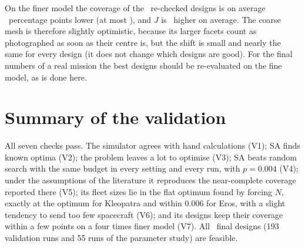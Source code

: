 On the finer model the coverage of the \fineDesigns\ re-checked designs is on average \fineMeanDC\
percentage points lower (at most \fineMaxDC), and $J$ is \fineMeanDJ\ higher on average. The coarse mesh is
therefore slightly optimistic, because its larger facets count as photographed as soon as their
centre is, but the shift is small and nearly the same for every design (it does not change which
designs are good). For the final numbers of a real mission the best designs should be re-evaluated
on the fine model, as is done here.

\section{Summary of the validation}
All seven checks pass. The simulator agrees with hand calculations (V1); \ac{SA} finds known optima
(V2); the problem leaves a lot to optimise (V3); \ac{SA} beats random search with the same budget in
every setting and every run, with $p=0.004$ (V4); under the assumptions of the literature it reproduces
the near-complete coverage reported there (V5); its fleet sizes lie in the flat optimum found by
forcing $N$, exactly at the optimum for Kleopatra and within 0.006 for Eros, with a slight
tendency to send too few spacecraft (V6); and its designs keep their coverage within a few points
on a four times finer model (V7). All \nRuns\ final designs (193 validation runs and 55 runs of the parameter study) are feasible.
